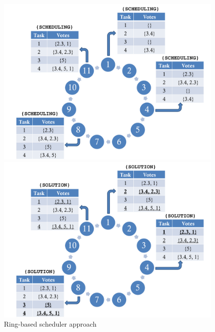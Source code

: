 \begin{figure}[ht]
  \begin{minipage}[b]{0.5\linewidth}
    \includegraphics[width=\linewidth]{Figures/ring_1.pdf}
  \end{minipage}  
  \begin{minipage}[b]{0.5\linewidth}
    \includegraphics[width=\linewidth]{Figures/ring_2.pdf}
  \end{minipage}
  \caption{Ring-based scheduler approach}\label{fig_ring}
\end{figure}

